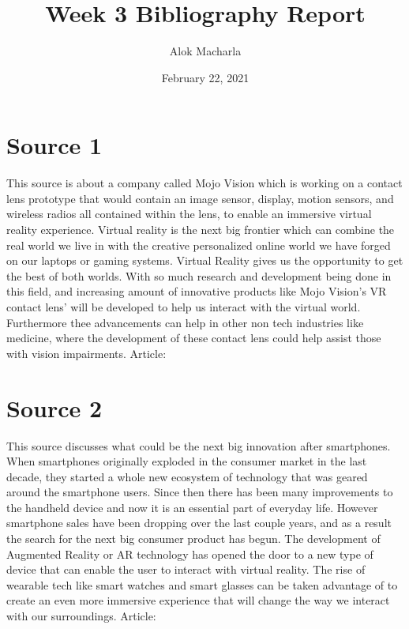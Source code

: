 \documentclass{article}
\title{Week 3 Bibliography Report}
\author{Alok Macharla }
\date{February 22, 2021}
\begin{document}
\maketitle

\section{Source 1}
This source is about a company called Mojo Vision which is working on a contact lens prototype that would contain an image sensor, display, motion sensors, and wireless radios all contained within the lens, to enable an immersive virtual reality experience. 
Virtual reality is the next big frontier which can  combine the real world we live in with the creative personalized online world we have forged on our laptops or gaming systems. Virtual Reality gives us the opportunity to get the best of both worlds. With so much research and development being done in this field, and increasing amount of innovative products like Mojo Vision's VR contact lens' will be developed to help us interact with the virtual world. Furthermore thee advancements can help in other non tech industries like medicine, where the development of these contact lens could help assist those with vision impairments. 
Article: \cite{perry_2021}

\section{Source 2}
This source discusses what could be the next big innovation after smartphones. When smartphones originally exploded in the consumer market in the last decade, they started a whole new ecosystem of technology that was geared around the smartphone users. Since then there has been many improvements to the handheld device and now it is an essential part of everyday life. However smartphone sales have been dropping over the last couple years, and as a result the search for the next big consumer product has begun. The development of Augmented Reality or AR technology has opened the door to a new type of device that can enable the user to interact with virtual reality. The rise of wearable tech like smart watches and smart glasses can be taken advantage of to create an even more immersive experience that will change the way we interact with our surroundings.
Article: \cite{leswing_2021}
\end{document}
